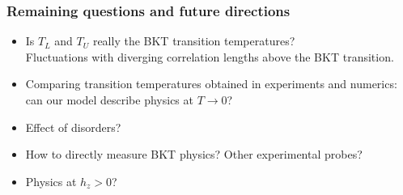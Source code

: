 \documentclass[xcolor=table, aspectratio=1610,ignorenonframetext]{beamer}
\begin{document}
\begin{frame}
  \frametitle{Remaining questions and future directions}
  \begin{itemize}
    \item Is $T_L$ and $T_U$ really the BKT transition temperatures?\\
    Fluctuations with diverging correlation lengths above the BKT transition.
    \item Comparing transition temperatures obtained in experiments and numerics: can our model describe physics at $T\rightarrow0$?
    \item Effect of disorders?
    \item How to directly measure BKT physics? Other experimental probes?
    \item Physics at $h_z>0$?
  \end{itemize}
\end{frame}
\end{document}
